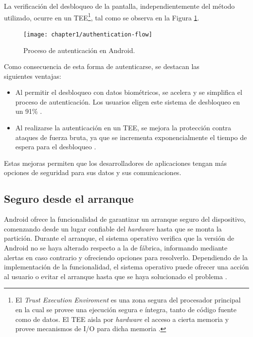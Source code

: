 La verificación del desbloqueo de la pantalla, independientemente del método utilizado, ocurre en un TEE\footnote{El \textit{Trust Execution Enviroment} es una zona segura del procesador principal en la cual se provee una ejecución segura e íntegra, tanto de código fuente como de datos. El TEE aisla por \textit{hardware} el acceso a cierta memoria y provee mecanismos de I/O para dicha memoria \cite{tee2011}.}, tal como se observa en la Figura \ref{fig:ch01:authentication-flow}.\\

\begin{figure}[htbp]
	\begin{center}
		\texttt{[image: chapter1/authentication-flow]}
		\caption{Proceso de autenticación en Android\cite{aossec}.}
		\label{fig:ch01:authentication-flow}
	\end{center}
\end{figure}
Como consecuencia de esta forma de autenticarse, se destacan las \\siguientes ventajas:
\begin{itemize}
    \item Al permitir el desbloqueo con datos biométricos, se acelera y se simplifica el proceso de autenticación. Los usuarios eligen este sistema de desbloqueo en un 91\% \cite{asreview2015}.
    \item Al realizarse la autenticación en un TEE, se mejora la protección contra ataques de fuerza bruta, ya que se incrementa exponencialmente el tiempo de espera para el desbloqueo \cite{asreview2015}.
\end{itemize}
Estas mejoras permiten que los desarrolladores de aplicaciones tengan más opciones de seguridad para sus datos y sus comunicaciones.
\subsection{Seguro desde el arranque}\label{fig:ch03:verify-boot}
Android ofrece la funcionalidad de garantizar un arranque seguro del dispositivo, comenzando desde un lugar confiable del \textit{hardware} hasta que se monta la partición. Durante el arranque, el sistema operativo verifica que la versión de Android no se haya alterado respecto a la de fábrica, informando mediante alertas en caso contrario y ofreciendo opciones para resolverlo. Dependiendo de la implementación de la funcionalidad, el sistema operativo puede ofrecer una acción al usuario o evitar el arranque hasta que se haya solucionado el problema \cite{aossec}.\\

